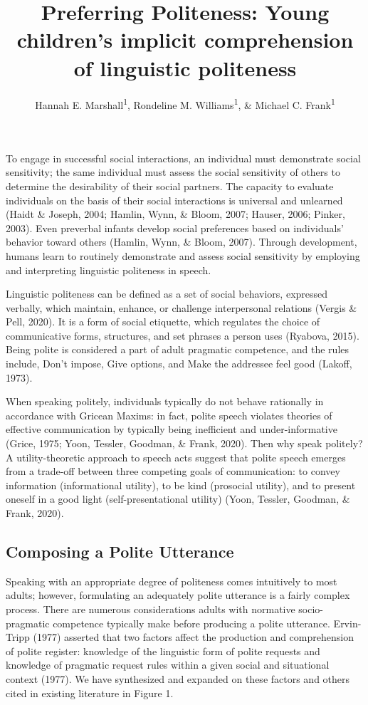\documentclass[
  english,
  man,floatsintext]{apa6}
\title{Preferring Politeness: Young children's implicit comprehension of linguistic politeness}
\author{Hannah E. Marshall\textsuperscript{1}, Rondeline M. Williams\textsuperscript{1}, \& Michael C. Frank\textsuperscript{1}}
\date{}
\affiliation{\vspace{0.5cm}\textsuperscript{1} Stanford University}
\begin{document}
\maketitle

To engage in successful social interactions, an individual must demonstrate social sensitivity; the same individual must assess the social sensitivity of others to determine the desirability of their social partners. The capacity to evaluate individuals on the basis of their social interactions is universal and unlearned (Haidt \& Joseph, 2004; Hamlin, Wynn, \& Bloom, 2007; Hauser, 2006; Pinker, 2003). Even preverbal infants develop social preferences based on individuals' behavior toward others (Hamlin, Wynn, \& Bloom, 2007). Through development, humans learn to routinely demonstrate and assess social sensitivity by employing and interpreting linguistic politeness in speech.

Linguistic politeness can be defined as a set of social behaviors, expressed verbally, which maintain, enhance, or challenge interpersonal relations (Vergis \& Pell, 2020). It is a form of social etiquette, which regulates the choice of communicative forms, structures, and set phrases a person uses (Ryabova, 2015). Being polite is considered a part of adult pragmatic competence, and the rules include, Don't impose, Give options, and Make the addressee feel good (Lakoff, 1973).

When speaking politely, individuals typically do not behave rationally in accordance with Gricean Maxims: in fact, polite speech violates theories of effective communication by typically being inefficient and under-informative (Grice, 1975; Yoon, Tessler, Goodman, \& Frank, 2020). Then why speak politely? A utility-theoretic approach to speech acts suggest that polite speech emerges from a trade-off between three competing goals of communication: to convey information (informational utility), to be kind (prosocial utility), and to present oneself in a good light (self-presentational utility) (Yoon, Tessler, Goodman, \& Frank, 2020).

\hypertarget{composing-a-polite-utterance}{%
\subsection{Composing a Polite Utterance}\label{composing-a-polite-utterance}}

Speaking with an appropriate degree of politeness comes intuitively to most adults; however, formulating an adequately polite utterance is a fairly complex process. There are numerous considerations adults with normative socio-pragmatic competence typically make before producing a polite utterance. Ervin-Tripp (1977) asserted that two factors affect the production and comprehension of polite register: knowledge of the linguistic form of polite requests and knowledge of pragmatic request rules within a given social and situational context (1977). We have synthesized and expanded on these factors and others cited in existing literature in Figure 1.
\end{document}
